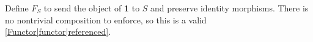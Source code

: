 Define $F_S$ to send the object of \textbf{1} to $S$ and preserve identity morphisms. There is no nontrivial composition to enforce, so this is a valid \ref{Functor|functor|referenced}.

